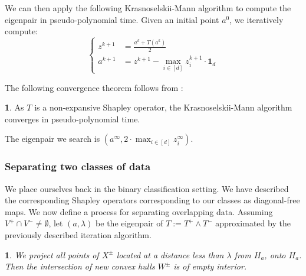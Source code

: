 \documentclass[oneside,english]{amsart}
\numberwithin{equation}{section}
\numberwithin{figure}{section}
\theoremstyle{plain}
\theoremstyle{definition}
\theoremstyle{plain}
\newtheorem{prop}[thm]{\protect\propositionname}
\theoremstyle{remark}
\theoremstyle{plain}
\theoremstyle{definition}
\newtheorem{cor}[thm]{\protect\corollaryname}
\theoremstyle{definition}
\providecommand{\propositionname}{Proposition}
\providecommand{\corollaryname}{Corollary}
\begin{document}
We can then apply the following Krasnoselskii-Mann algorithm to compute
the eigenpair in pseudo-polynomial time. Given an initial point $a^{0}$,
we iteratively compute: 
\[
\begin{cases}
z^{k+1} & =\frac{a^{k}+T(a^{k})}{2}\\
a^{k+1} & =z^{k+1}-\max_{i\in[d]}z_{i}^{k+1}\cdot\textbf{1}_{d}
\end{cases}
\]

The following convergence theorem follows from \cite{Cominetti2013}:
\begin{cor}
As $T$ is a non-expansive Shapley operator, the Krasnoselskii-Mann
algorithm converges in pseudo-polynomial time. 
\end{cor}

The eigenpair we search is $\left(a^{\infty},2\cdot\max_{i\in[d]}z_{i}^{\infty}\right)$.

\subsubsection{Separating two classes of data}

We place ourselves back in the binary classification setting. We have
described the corresponding Shapley operators corresponding to our
classes as diagonal-free maps. We now define a process for separating
overlapping data. Assuming $V^{+}\cap V^{-}\ne\emptyset$, let $\left(a,\lambda\right)$
be the eigenpair of $T:=T^{+}\wedge T^{-}$ approximated by the previously
described iteration algorithm. 
\begin{prop}
We project all points of $X^{\pm}$ located at a distance less than
$\lambda$ from $H_{a}$, onto $H_{a}$. Then the intersection
of new convex hulls $W^{\pm}$ is of empty interior. 
\end{prop}
\end{document}
